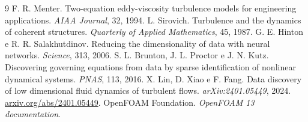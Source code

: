 \documentclass[12pt,a4paper]{article}
\begin{document}
\begin{thebibliography}{9}
 F. R. Menter. Two-equation eddy-viscosity turbulence models for engineering applications. \emph{AIAA Journal}, 32, 1994.
 L. Sirovich. Turbulence and the dynamics of coherent structures. \emph{Quarterly of Applied Mathematics}, 45, 1987.
 G. E. Hinton e R. R. Salakhutdinov. Reducing the dimensionality of data with neural networks. \emph{Science}, 313, 2006.
 S. L. Brunton, J. L. Proctor e J. N. Kutz. Discovering governing equations from data by sparse identification of nonlinear dynamical systems. \emph{PNAS}, 113, 2016.
 X. Lin, D. Xiao e F. Fang. Data discovery of low dimensional fluid dynamics of turbulent flows. \emph{arXiv:2401.05449}, 2024. \href{https://arxiv.org/abs/2401.05449}{arxiv.org/abs/2401.05449}.
 OpenFOAM Foundation. \emph{OpenFOAM 13 documentation}.
\end{thebibliography}
\end{document}
